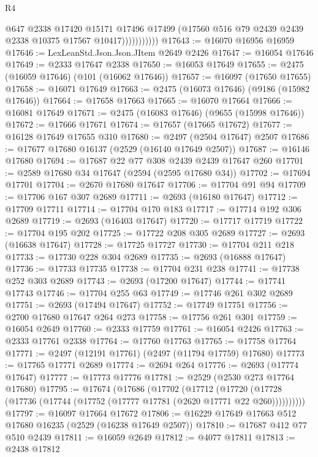 \begin{lexlean}{R4}
\begin{coremodule}
                        @647
                        @2338
                        @17420
                        @15171
                        @17496
                        @17499
                        (@17560 @516 @79 @2439 @2439 @2338 @10375 @17567 @10417)))))))))))
@17643 := @16070 @16956 @16959
@17646 := LexLeanStd.Json.Json.JItem @2649 @2426
@17647 := @16054 @17646
@17649 := @2333 @17647 @2338
@17650 := @16053 @17649
@17655 := @2475 (@16059 @17646) (@101 (@16062 @17646))
@17657 := @16097 (@17650 @17655)
@17658 := @16071 @17649
@17663 := @2475 (@16073 @17646) (@9186 (@15982 @17646))
@17664 := @17658 @17663
@17665 := @16070 @17664
@17666 := @16081 @17649
@17671 := @2475 (@16083 @17646) (@9655 (@15998 @17646))
@17672 := @17666 @17671
@17674 := @17657 (@17665 @17672)
@17677 := @16128 @17649 @17655 @310
@17680 := @2497 (@2504 @17647) @2507
@17686 := @17677 @17680 @16137 (@2529 (@16140 @17649 @2507))
@17687 := @16146 @17680
@17694 := @17687 @22 @77 @308 @2439 @2439 @17647 @260
@17701 := @2589 @17680 @34 @17647 (@2594 (@2595 @17680 @34))
@17702 := @17694 @17701
@17704 := @2670 @17680 @17647
@17706 := @17704 @91 @94
@17709 := @17706 @167 @307 @2689
@17711 := @2693 (@16180 @17647)
@17712 := @17709 @17711
@17714 := @17704 @170 @183
@17717 := @17714 @192 @306 @2689
@17719 := @2693 (@16403 @17647)
@17720 := @17717 @17719
@17722 := @17704 @195 @202
@17725 := @17722 @208 @305 @2689
@17727 := @2693 (@16638 @17647)
@17728 := @17725 @17727
@17730 := @17704 @211 @218
@17733 := @17730 @228 @304 @2689
@17735 := @2693 (@16888 @17647)
@17736 := @17733 @17735
@17738 := @17704 @231 @238
@17741 := @17738 @252 @303 @2689
@17743 := @2693 (@17200 @17647)
@17744 := @17741 @17743
@17746 := @17704 @255 @63
@17749 := @17746 @261 @302 @2689
@17751 := @2693 (@17494 @17647)
@17752 := @17749 @17751
@17756 := @2700 @17680 @17647 @264 @273
@17758 := @17756 @261 @301
@17759 := @16054 @2649
@17760 := @2333 @17759
@17761 := @16054 @2426
@17763 := @2333 @17761 @2338
@17764 := @17760 @17763
@17765 := @17758 @17764
@17771 := @2497 (@12191 @17761) (@2497 (@11794 @17759) @17680)
@17773 := @17765 @17771 @2689
@17774 := @2694 @264
@17776 := @2693 (@17774 @17647)
@17777 := @17773 @17776
@17781 := @2529 (@2530 @273 @17764 @17680)
@17795 := @17674
    (@17686
      (@17702
        (@17712
          (@17720 (@17728 (@17736 (@17744 (@17752 (@17777 @17781 (@2620 @17771 @22 @260))))))))))
@17797 := @16097 @17664 @17672
@17806 := @16229 @17649 @17663 @512 @17680 @16235 (@2529 (@16238 @17649 @2507))
@17810 := @17687 @412 @77 @510 @2439
@17811 := @16059 @2649
@17812 := @4077 @17811
@17813 := @2438 @17812

\end{coremodule}
\end{lexlean}
